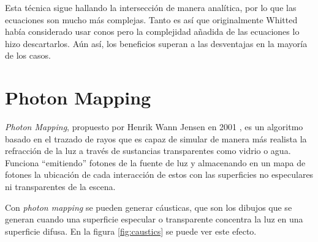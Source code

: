Esta técnica sigue hallando la intersección de manera analítica, por lo que las ecuaciones son mucho más complejas.
Tanto es así que originalmente Whitted había considerado usar conos pero la complejidad añadida de las ecuaciones lo hizo descartarlos.
Aún así, los beneficios superan a las desventajas en la mayoría de los casos.

\section{Photon Mapping}

\textit{Photon Mapping}, propuesto por Henrik Wann Jensen en 2001 \cite{photon-mapping}, es un algoritmo basado en el trazado de rayos que es capaz de simular de manera más realista la refracción de la luz a través de sustancias transparentes como vidrio o agua. 
Funciona ``emitiendo'' fotones de la fuente de luz y almacenando en un mapa de fotones la ubicación de cada interacción de estos con las superficies no especulares ni transparentes de la escena.

Con \textit{photon mapping} se pueden generar cáusticas, que son los dibujos que se generan cuando una superficie especular o transparente concentra la luz en una superficie difusa.
En la figura \ref{fig:caustics} se puede ver este efecto.

